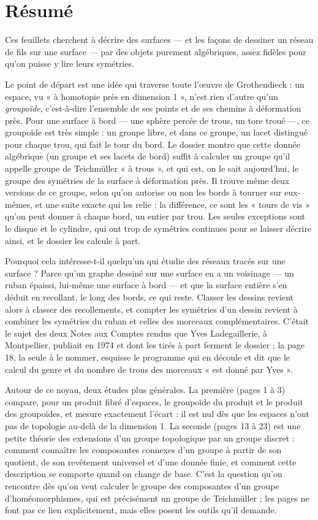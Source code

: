 \documentclass[11pt,a4paper]{article}
\begin{document}
\section*{Résumé}

\begin{resume}
Ces feuillets cherchent à décrire des surfaces — et les façons de dessiner un
réseau de fils sur une surface — par des objets purement algébriques, assez
fidèles pour qu'on puisse y lire leurs symétries.

Le point de départ est une idée qui traverse toute l'œuvre de Grothendieck :
un espace, vu « à homotopie près en dimension 1 », n'est rien d'autre qu'un
\emph{groupoïde}, c'est-à-dire l'ensemble de ses points et de ses chemins à
déformation près. Pour une surface à bord — une sphère percée de trous, un
tore troué —, ce groupoïde est très simple : un groupe libre, et dans ce
groupe, un lacet distingué pour chaque trou, qui fait le tour du bord. Le
dossier montre que cette donnée algébrique (un groupe et ses lacets de bord)
suffit à calculer un groupe qu'il appelle groupe de Teichmüller « à trous »,
et qui est, on le sait aujourd'hui, le groupe des symétries de la surface à
déformation près. Il trouve même deux
versions de ce groupe, selon qu'on autorise ou non les bords à tourner sur
eux-mêmes, et une suite exacte qui les relie : la différence, ce sont les
« tours de vis » qu'on peut donner à chaque bord, un entier par trou. Les
seules exceptions sont le disque et le cylindre, qui ont trop de symétries
continues pour se laisser décrire ainsi, et le dossier les calcule à part.

Pourquoi cela intéresse-t-il quelqu'un qui étudie des réseaux tracés sur une
surface ? Parce qu'un graphe dessiné sur une surface en a un voisinage — un
ruban épaissi, lui-même une surface à bord — et que la surface entière s'en
déduit en recollant, le long des bords, ce qui reste. Classer les dessins
revient alors à classer des recollements, et compter les symétries d'un
dessin revient à combiner les symétries du ruban et celles des morceaux
complémentaires. C'était le sujet des deux Notes aux Comptes rendus que Yves
Ladegaillerie, à Montpellier, publiait en 1974 et dont les tirés à part
ferment le dossier ; la page 18, la seule à le nommer, esquisse le programme
qui en découle et dit que le calcul du genre et du nombre de trous des
morceaux « est donné par Yves ».

Autour de ce noyau, deux études plus générales. La première (pages 1 à 3)
compare, pour un produit fibré d'espaces, le groupoïde du produit et le
produit des groupoïdes, et mesure exactement l'écart : il est nul dès que les
espaces n'ont pas de topologie au-delà de la dimension 1. La seconde (pages 13
à 23) est une petite théorie des extensions d'un groupe topologique par un
groupe discret : comment connaître les composantes connexes d'un groupe à
partir de son quotient, de son revêtement universel et d'une donnée finie, et
comment cette description se comporte quand on change de base. C'est la
question qu'on rencontre dès qu'on veut calculer le groupe des composantes
d'un groupe d'homéomorphismes, qui est précisément un groupe de Teichmüller ;
les pages ne font pas ce lien explicitement, mais elles posent les outils
qu'il demande.


\end{resume}
\end{document}
